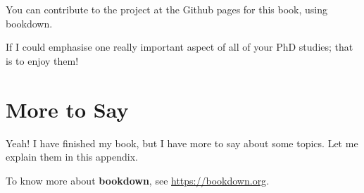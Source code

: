 \documentclass[
]{krantz}
\begin{document}
You can contribute to the project at the Github pages for this book, using bookdown.

If I could emphasise one really important aspect of all of your PhD studies; that is to enjoy them!

\cleardoublepage

\hypertarget{appendix-appendix}{%
\appendix {}}


\hypertarget{more-to-say}{%
\chapter{More to Say}\label{more-to-say}}

Yeah! I have finished my book, but I have more to say about some topics. Let me explain them in this appendix.

To know more about \textbf{bookdown}, see \url{https://bookdown.org}.

  

\backmatter
\printindex
\end{document}
